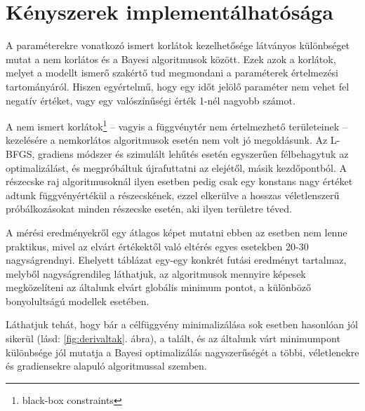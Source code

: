 \section{Kényszerek implementálhatósága}
A paraméterekre vonatkozó ismert korlátok kezelhetősége látványos különbséget mutat a nem korlátos és a Bayesi algoritmusok között. Ezek azok a korlátok, melyet a modellt ismerő szakértő tud megmondani a paraméterek értelmezési tartományáról. Hiszen egyértelmű, hogy egy időt jelölő paraméter nem vehet fel negatív értéket, vagy egy valószínűségi érték 1-nél nagyobb számot.

A nem ismert korlátok\footnote{black-box constraints} -- vagyis a függvénytér nem értelmezhető területeinek -- kezelésére a nemkorlátos algoritmusok esetén nem volt jó megoldásunk. Az L-BFGS, gradiens módszer és szimulált lehűtés esetén egyszerűen félbehagytuk az optimalizálást, és megpróbáltuk újrafuttatni az elejétől, másik kezdőpontból. A részecske raj algoritmusoknál ilyen esetben pedig csak egy konstans nagy értéket adtunk függvényértékül a részecskének, ezzel elkerülve a hosszas véletlenszerű próbálkozásokat minden részecske esetén, aki ilyen területre téved.

A mérési eredményekről egy átlagos képet mutatni ebben az esetben nem lenne praktikus, mivel az elvárt értékektől való eltérés egyes esetekben 20-30 nagyságrendnyi. Ehelyett   táblázat egy-egy konkrét futási eredményt tartalmaz, melyből nagyságrendileg láthatjuk, az algoritmusok mennyire képesek megközelíteni az általunk elvárt globális minimum pontot, a különböző bonyolultságú modellek esetében.

Láthatjuk tehát, hogy bár a célfüggvény minimalizálása sok esetben hasonlóan jól sikerül (lásd: \ref{fig:derivaltak}. ábra), a talált, és az általunk várt minimumpont különbsége jól mutatja a Bayesi optimalizálás nagyszerűségét a többi, véletlenekre és gradiensekre alapuló algoritmussal szemben.


